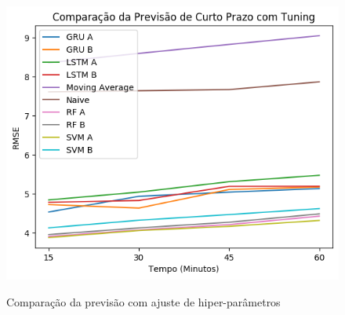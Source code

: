 \begin{figure}[H]
    \centering
    \includegraphics[scale=0.9]{monography/img/comparisons/comparacao_da_previsao_de_curto_prazo_com_tuning_rmse.png}
    \label{figure:pred_tuning}
    \caption{Comparação da previsão com ajuste de hiper-parâmetros}
\end{figure}

